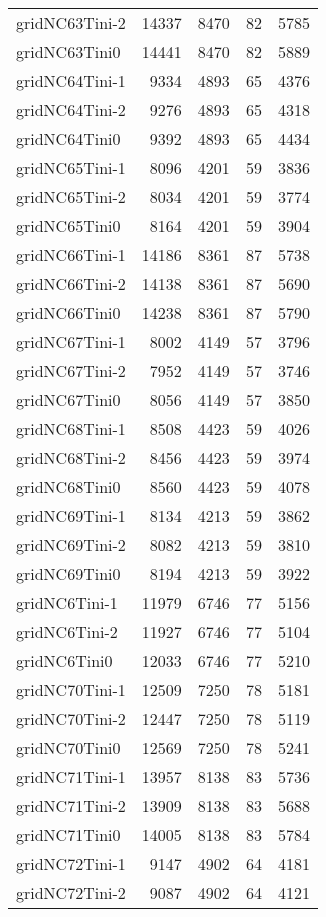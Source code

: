 \begin{longtable}{lrrrr}
gridNC63Tini-2 & 14337 & 8470 & 82 & 5785 \\
gridNC63Tini0 & 14441 & 8470 & 82 & 5889 \\
gridNC64Tini-1 & 9334 & 4893 & 65 & 4376 \\
gridNC64Tini-2 & 9276 & 4893 & 65 & 4318 \\
gridNC64Tini0 & 9392 & 4893 & 65 & 4434 \\
gridNC65Tini-1 & 8096 & 4201 & 59 & 3836 \\
gridNC65Tini-2 & 8034 & 4201 & 59 & 3774 \\
gridNC65Tini0 & 8164 & 4201 & 59 & 3904 \\
gridNC66Tini-1 & 14186 & 8361 & 87 & 5738 \\
gridNC66Tini-2 & 14138 & 8361 & 87 & 5690 \\
gridNC66Tini0 & 14238 & 8361 & 87 & 5790 \\
gridNC67Tini-1 & 8002 & 4149 & 57 & 3796 \\
gridNC67Tini-2 & 7952 & 4149 & 57 & 3746 \\
gridNC67Tini0 & 8056 & 4149 & 57 & 3850 \\
gridNC68Tini-1 & 8508 & 4423 & 59 & 4026 \\
gridNC68Tini-2 & 8456 & 4423 & 59 & 3974 \\
gridNC68Tini0 & 8560 & 4423 & 59 & 4078 \\
gridNC69Tini-1 & 8134 & 4213 & 59 & 3862 \\
gridNC69Tini-2 & 8082 & 4213 & 59 & 3810 \\
gridNC69Tini0 & 8194 & 4213 & 59 & 3922 \\
gridNC6Tini-1 & 11979 & 6746 & 77 & 5156 \\
gridNC6Tini-2 & 11927 & 6746 & 77 & 5104 \\
gridNC6Tini0 & 12033 & 6746 & 77 & 5210 \\
gridNC70Tini-1 & 12509 & 7250 & 78 & 5181 \\
gridNC70Tini-2 & 12447 & 7250 & 78 & 5119 \\
gridNC70Tini0 & 12569 & 7250 & 78 & 5241 \\
gridNC71Tini-1 & 13957 & 8138 & 83 & 5736 \\
gridNC71Tini-2 & 13909 & 8138 & 83 & 5688 \\
gridNC71Tini0 & 14005 & 8138 & 83 & 5784 \\
gridNC72Tini-1 & 9147 & 4902 & 64 & 4181 \\
gridNC72Tini-2 & 9087 & 4902 & 64 & 4121 \\

\end{longtable}
